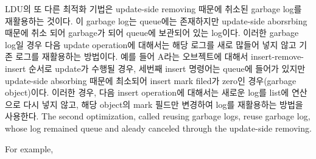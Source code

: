 
\ifkor
LDU의 또 다른 최적화 기법은 update-side removing 때문에 취소된 garbage log를 재활용하는 것이다.
이 garbage log는 queue에는 존재하지만 update-side aborsrbing 때문에 취소 되어 garbage가 되어 queue에
보관되어 있는 log이다. 
이러한 garbage log일 경우 다음 update operation에 대해서는 해당 로그를 새로 많들어 넣지 않고 기존 로그를 재활용하는
방법이다.
예를 들어 A라는 오브젝트에 대해서 insert-remove-insert 순서로 update가 수행될 경우, 세번째 insert 명령어는
queue에 들어가 있지만 update-side absorbing 때문에 최소되어 insert mark filed가 zero인
경우(garbage object)이다.
이러한 경우, 다음 insert operation에 대해서는 새로운 log를 list에 연산으로 다시 넣지 않고, 해당 object의 mark
필드만 변경하여 log를 재활용하는 방법을 사용한다.
\else
The second optimization, called reusing garbage logs, reuse garbage log, whose
log remained queue and aleady canceled through the update-side removing.


For example, 


\fi


